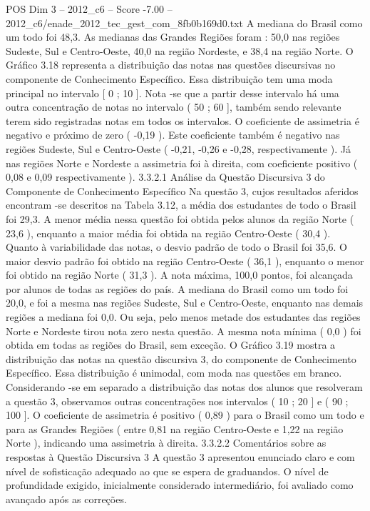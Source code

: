 \begin{textsample}{POS Dim 3 – 2012\_c6 – Score -7.00 – 2012\_c6/enade\_2012\_tec\_gest\_com\_8fb0b169d0.txt}
A mediana do Brasil como um todo foi 48,3.
As medianas das Grandes Regiões foram : 50,0 nas regiões Sudeste, Sul e Centro-Oeste, 40,0 na região Nordeste, e 38,4 na região Norte.
O Gráfico 3.18 representa a distribuição das notas nas questões discursivas no componente de Conhecimento Específico.
Essa distribuição tem uma moda principal no intervalo [ 0 ; 10 ].
Nota -se que a partir desse intervalo há uma outra concentração de notas no intervalo ( 50 ; 60 ], também sendo relevante terem sido registradas notas em todos os intervalos.
O coeficiente de assimetria é negativo e próximo de zero ( -0,19 ).
Este coeficiente também é negativo nas regiões Sudeste, Sul e Centro-Oeste ( -0,21, -0,26 e -0,28, respectivamente ).
Já nas regiões Norte e Nordeste a assimetria foi à direita, com coeficiente positivo ( 0,08 e 0,09 respectivamente ). 3.3.2.1 Análise da Questão Discursiva 3 do Componente de Conhecimento Específico Na questão 3, cujos resultados aferidos encontram -se descritos na Tabela 3.12, a média dos estudantes de todo o Brasil foi 29,3.
A menor média nessa questão foi obtida pelos alunos da região Norte ( 23,6 ), enquanto a maior média foi obtida na região Centro-Oeste ( 30,4 ).
Quanto à variabilidade das notas, o desvio padrão de todo o Brasil foi 35,6.
O maior desvio padrão foi obtido na região Centro-Oeste ( 36,1 ), enquanto o menor foi obtido na região Norte ( 31,3 ).
A nota máxima, 100,0 pontos, foi alcançada por alunos de todas as regiões do país.
A mediana do Brasil como um todo foi 20,0, e foi a mesma nas regiões Sudeste, Sul e Centro-Oeste, enquanto nas demais regiões a mediana foi 0,0.
Ou seja, pelo menos metade dos estudantes das regiões Norte e Nordeste tirou nota zero nesta questão.
A mesma nota mínima ( 0,0 ) foi obtida em todas as regiões do Brasil, sem exceção.
O Gráfico 3.19 mostra a distribuição das notas na questão discursiva 3, do componente de Conhecimento Específico.
Essa distribuição é unimodal, com moda nas questões em branco.
Considerando -se em separado a distribuição das notas dos alunos que resolveram a questão 3, observamos outras concentrações nos intervalos ( 10 ; 20 ] e ( 90 ; 100 ].
O coeficiente de assimetria é positivo ( 0,89 ) para o Brasil como um todo e para as Grandes Regiões ( entre 0,81 na região Centro-Oeste e 1,22 na região Norte ), indicando uma assimetria à direita. 3.3.2.2 Comentários sobre as respostas à Questão Discursiva 3 A questão 3 apresentou enunciado claro e com nível de sofisticação adequado ao que se espera de graduandos.
O nível de profundidade exigido, inicialmente considerado intermediário, foi avaliado como avançado após as correções.

\end{textsample}
